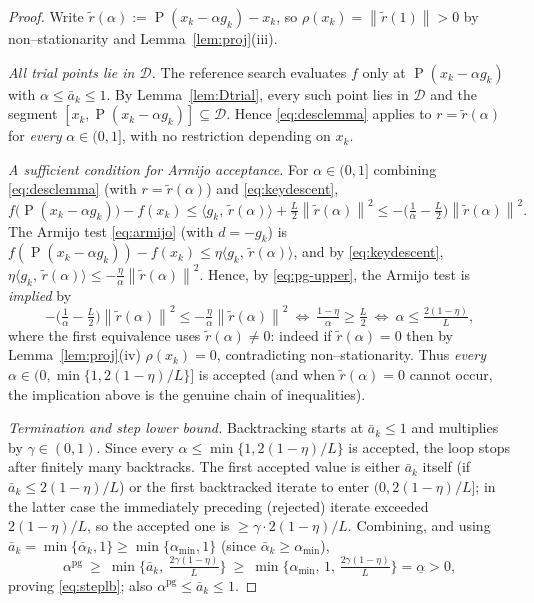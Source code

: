 \documentclass[12pt]{article}
\DeclareMathOperator{\proj}{P}
\newcommand{\norm}[1]{\left\lVert #1 \right\rVert}
\newcommand{\inner}[2]{\langle #1,\, #2\rangle}
\begin{document}
\begin{proof}
Write $\widetilde r(\alpha):=\proj(x_k-\alpha g_k)-x_k$, so
$\rho(x_k)=\norm{\widetilde r(1)}>0$ by non--stationarity and
Lemma~\ref{lem:proj}(iii).

\emph{All trial points lie in $\mathcal D$.} The reference search evaluates $f$
only at $\proj(x_k-\alpha g_k)$ with $\alpha\le\bar a_k\le1$. By
Lemma~\ref{lem:Dtrial}, every such point lies in $\mathcal D$ and the segment
$[x_k,\proj(x_k-\alpha g_k)]\subseteq\mathcal D$. Hence \eqref{eq:desclemma}
applies to $r=\widetilde r(\alpha)$ for \emph{every} $\alpha\in(0,1]$, with no
restriction depending on $x_k$.

\emph{A sufficient condition for Armijo acceptance.} For $\alpha\in(0,1]$
combining \eqref{eq:desclemma} (with $r=\widetilde r(\alpha)$) and
\eqref{eq:keydescent},
\begin{equation}\label{eq:pg-upper}
f\big(\proj(x_k-\alpha g_k)\big)-f(x_k)
\le\inner{g_k}{\widetilde r(\alpha)}+\tfrac{L}{2}\norm{\widetilde r(\alpha)}^2
\le-\Big(\tfrac1\alpha-\tfrac L2\Big)\norm{\widetilde r(\alpha)}^2 .
\end{equation}
The Armijo test \eqref{eq:armijo} (with $d=-g_k$) is
$f(\proj(x_k-\alpha g_k))-f(x_k)\le\eta\inner{g_k}{\widetilde r(\alpha)}$, and by
\eqref{eq:keydescent}, $\eta\inner{g_k}{\widetilde r(\alpha)}\le
-\tfrac{\eta}{\alpha}\norm{\widetilde r(\alpha)}^2$. Hence, by
\eqref{eq:pg-upper}, the Armijo test is \emph{implied} by
\[
-\Big(\tfrac1\alpha-\tfrac L2\Big)\norm{\widetilde r(\alpha)}^2
\le-\tfrac{\eta}{\alpha}\norm{\widetilde r(\alpha)}^2
\ \Longleftrightarrow\
\tfrac{1-\eta}{\alpha}\ge\tfrac L2
\ \Longleftrightarrow\
\alpha\le\tfrac{2(1-\eta)}{L},
\]
where the first equivalence uses $\widetilde r(\alpha)\neq0$: indeed if
$\widetilde r(\alpha)=0$ then by Lemma~\ref{lem:proj}(iv) $\rho(x_k)=0$,
contradicting non--stationarity. Thus \emph{every}
$\alpha\in(0,\min\{1,2(1-\eta)/L\}]$ is accepted (and when
$\widetilde r(\alpha)=0$ cannot occur, the implication above is the genuine
chain of inequalities).

\emph{Termination and step lower bound.} Backtracking starts at
$\bar a_k\le1$ and multiplies by $\gamma\in(0,1)$. Since every
$\alpha\le\min\{1,2(1-\eta)/L\}$ is accepted, the loop stops after finitely many
backtracks. The first accepted value is either $\bar a_k$ itself (if
$\bar a_k\le 2(1-\eta)/L$) or the first backtracked iterate to enter
$(0,2(1-\eta)/L]$; in the latter case the immediately preceding (rejected)
iterate exceeded $2(1-\eta)/L$, so the accepted one is
$\ge\gamma\cdot2(1-\eta)/L$. Combining, and using
$\bar a_k=\min\{\bar\alpha_k,1\}\ge\min\{\alpha_{\min},1\}$ (since
$\bar\alpha_k\ge\alpha_{\min}$),
\[
\alpha^{\mathrm{pg}}\ \ge\ \min\Big\{\bar a_k,\ \tfrac{2\gamma(1-\eta)}{L}\Big\}
\ \ge\ \min\Big\{\alpha_{\min},\,1,\,\tfrac{2\gamma(1-\eta)}{L}\Big\}
=\underline\alpha>0,
\]
proving \eqref{eq:steplb}; also $\alpha^{\mathrm{pg}}\le\bar a_k\le1$.


\end{proof}
\end{document}
